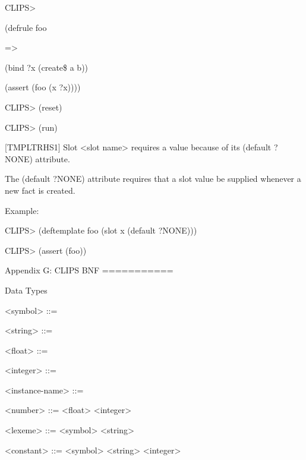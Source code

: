 \documentclass[letterpaper,10pt,english]{sphinxmanual}
\begin{document}
CLIPS\textgreater{}

(defrule foo

=\textgreater{}

(bind ?x (create\$ a b))

(assert (foo (x ?x))))

CLIPS\textgreater{} (reset)

CLIPS\textgreater{} (run)

{[}TMPLTRHS1{]} Slot \textless{}slot name\textgreater{} requires a value because of its (default
?NONE) attribute.

The (default ?NONE) attribute requires that a slot value be supplied
whenever a new fact is created.

Example:

CLIPS\textgreater{} (deftemplate foo (slot x (default ?NONE)))

CLIPS\textgreater{} (assert (foo))

Appendix G:
CLIPS BNF
===========

Data Types

\textless{}symbol\textgreater{} ::= 


\textless{}string\textgreater{} ::= 


\textless{}float\textgreater{} ::= 


\textless{}integer\textgreater{} ::= 


\textless{}instance-name\textgreater{} ::= 


\textless{}number\textgreater{} ::= \textless{}float\textgreater{} \textbar{} \textless{}integer\textgreater{}

\textless{}lexeme\textgreater{} ::= \textless{}symbol\textgreater{} \textbar{} \textless{}string\textgreater{}

\textless{}constant\textgreater{} ::= \textless{}symbol\textgreater{} \textbar{} \textless{}string\textgreater{} \textbar{} \textless{}integer\textgreater{} \textbar{}
\end{document}
